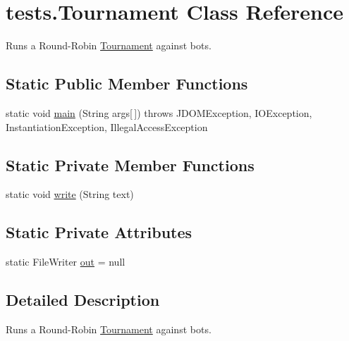 \hypertarget{classtests_1_1_tournament}{
\section{tests.Tournament Class Reference}
\label{classtests_1_1_tournament}
}


Runs a Round-\/Robin \hyperlink{classtests_1_1_tournament}{Tournament} against bots.  


\subsection*{Static Public Member Functions}
\begin{DoxyCompactItemize}
\item 
static void \hyperlink{classtests_1_1_tournament_a8d0acacdf00631655914f3d6816da75e}{main} (String args\mbox{[}$\,$\mbox{]})  throws JDOMException, IOException, InstantiationException, IllegalAccessException 
\end{DoxyCompactItemize}
\subsection*{Static Private Member Functions}
\begin{DoxyCompactItemize}
\item 
static void \hyperlink{classtests_1_1_tournament_ac9dbbd78ffcfd65e05a47aed8735ccbe}{write} (String text)
\end{DoxyCompactItemize}
\subsection*{Static Private Attributes}
\begin{DoxyCompactItemize}
\item 
static FileWriter \hyperlink{classtests_1_1_tournament_ab48c0ee6dcae1f2631d179c4e522fede}{out} = null
\end{DoxyCompactItemize}


\subsection{Detailed Description}
Runs a Round-\/Robin \hyperlink{classtests_1_1_tournament}{Tournament} against bots. 


